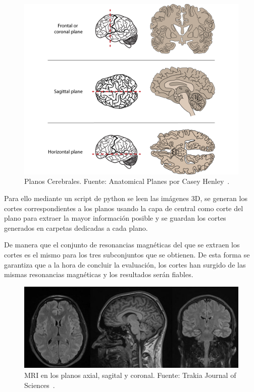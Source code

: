 \begin{figure}[H]
    \centering
    \includegraphics[width=\textwidth]{./imgs/planos-cerebrales}
    \caption{Planos Cerebrales. Fuente: Anatomical Planes por Casey Henley~\cite{img-planos-cerebrales}. }
    \label{fig:planos-cerebrales}
\end{figure}

Para ello mediante un script de python se leen las imágenes 3D, se generan los cortes correspondientes a los planos
usando la capa de central como corte del plano para extraer la mayor información posible y se guardan los cortes
generados en carpetas dedicadas a cada plano.

De manera que el conjunto de resonancias magnéticas del que se extraen los cortes es el mismo para los tres subconjuntos
que se obtienen.
De esta forma se garantiza que a la hora de concluir la evaluación, los cortes han surgido de las mismas resonancias
magnéticas y los resultados serán fiables.

\begin{figure}[H]
    \centering
    \includegraphics[width=\textwidth]{./imgs/MRI-planos-cerebrales}
    \caption{MRI en los planos axial, sagital y coronal.
    Fuente: Trakia Journal of Sciences~\cite{img-mri-planos-cerebrales}. }
    \label{fig:mri-planos-cerebrales}
\end{figure}

